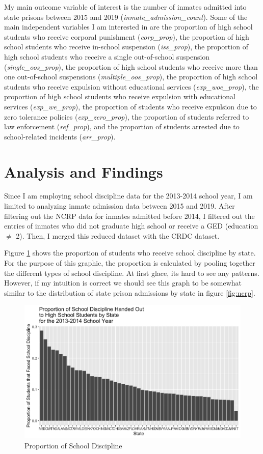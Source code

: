 \documentclass[12pt]{article}
\begin{document}
My main outcome variable of interest is the number of inmates admitted into state prisons between 2015 and 2019 (\emph{inmate\_admission\_count}). Some of the main independent variables I am interested in are the proportion of high school students who receive corporal punishment (\emph{corp\_prop}), the proportion of high school students who receive in-school suspension (\emph{iss\_prop}), the proportion of high school students who receive a single out-of-school suspension (\emph{single\_oos\_prop}), the proportion of high school students who receive more than one out-of-school suspensions (\emph{multiple\_oos\_prop}), the proportion of high school students who receive expulsion without educational services (\emph{exp\_woe\_prop}), the proportion of high school students who receive expulsion with educational services (\emph{exp\_we\_prop}), the proportion of students who receive expulsion due to zero tolerance policies (\emph{exp\_zero\_prop}), the proportion of students referred to law enforcement (\emph{ref\_prop}), and the proportion of students arrested due to school-related incidents (\emph{arr\_prop}).


\section*{Analysis and Findings}
Since I am employing school discipline data for the 2013-2014 school year, I am limited to analyzing inmate admission data between 2015 and 2019. After filtering out the NCRP data for inmates admitted before 2014, I filtered out the entries of inmates who did not graduate high school or receive a GED (education $\ne$ 2). Then, I merged this reduced dataset with the CRDC dataset. 


Figure \ref{fig:crdc} shows the proportion of students who receive school discipline by state. For the purpose of this graphic, the proportion is calculated by pooling together the different types of school discipline. At first glace, its hard to see any patterns. However, if my intuition is correct we should see this graph to be somewhat similar to the distribution of state prison admissions by state in figure \ref{fig:ncrp}.

\begin{figure}[H]
  \centering
  \includegraphics[width = 12cm]{CRDC_bar.png}
  \caption{Proportion of School Discipline}
  \label{fig:crdc}
\end{figure}
\end{document}
